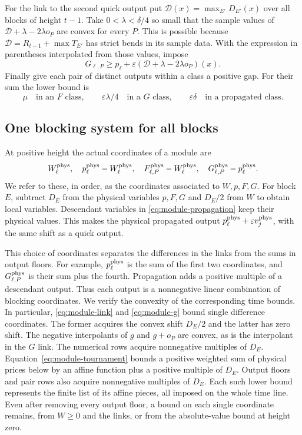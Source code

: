 For the link to the second quick output put
$\mathcal D(x)=\max_{E'}D_{E'}(x)$ over all blocks of height $t-1$.
Take $0<\lambda<\delta/4$ so small that the sample values of
$\mathcal D+\lambda-2\lambda o_P$ are convex for every $P$.
This is possible because $\mathcal D=R_{t-1}+\max T_{E'}$ has strict
bends in its sample data. With the expression in parentheses
interpolated from those values, impose
\begin{equation}\label{eq:module-g}
 G_{\ell,P}\ge p_\ell+\varepsilon
       (\mathcal D+\lambda-2\lambda o_P)(x).
\end{equation}
Finally give each pair of distinct outputs within a class a positive
gap. For their sum the lower bound is
\begin{equation}\label{eq:module-pairs}
 \mu\quad\text{in an $F$ class},\qquad
 \varepsilon\lambda/4\quad\text{in a $G$ class},\qquad
 \varepsilon\delta\quad\text{in a propagated class}.
\end{equation}

\subsection{One blocking system for all blocks}
At positive height the actual coordinates of a module are
\begin{equation}\label{eq:module-coordinates}
 W_\ell^{\rm phys},\quad p_\ell^{\rm phys}-W_\ell^{\rm phys},\quad
 F_{\ell,P}^{\rm phys}-W_\ell^{\rm phys},\quad
 G_{\ell,P}^{\rm phys}-p_\ell^{\rm phys}.
\end{equation}
We refer to these, in order, as the coordinates associated to $W,p,F,G$.
For block $E$, subtract $D_E$ from the physical variables $p,F,G$ and
$D_E/2$ from $W$ to obtain local variables. Descendant variables in
\eqref{eq:module-propagation} keep their physical values. This makes
the physical propagated output $p_\ell^{\rm phys}+\varepsilon
v_j^{\rm phys}$, with the same shift as a quick output.

This choice of coordinates separates the differences in the links from
the sums in output floors. For example, \(p_\ell^{\rm phys}\) is the sum
of the first two coordinates, and \(G_{\ell,P}^{\rm phys}\) is their sum
plus the fourth. Propagation adds a positive multiple of a descendant
output. Thus each output is a nonnegative linear combination of blocking
coordinates. We verify the convexity of the corresponding time bounds.
In particular, \eqref{eq:module-link} and \eqref{eq:module-g} bound single
difference coordinates. The former acquires the convex shift $D_E/2$
and the latter has zero shift. The negative interpolants of \(g\) and
\(g+o_P\) are convex, as is the interpolant in the \(G\) link. The numerical rows acquire nonnegative
multiples of $D_E$. Equation~\eqref{eq:module-tournament} bounds a
positive weighted sum of physical prices below by an affine function
plus a positive multiple of $D_E$. Output floors and pair rows also
acquire nonnegative multiples of $D_E$. Each such lower bound
represents the finite list of its affine pieces, all imposed on the
whole time line. Even after removing every output floor, a bound on
each single coordinate remains, from $W\ge0$ and the links, or from
the absolute-value bound at height zero.

